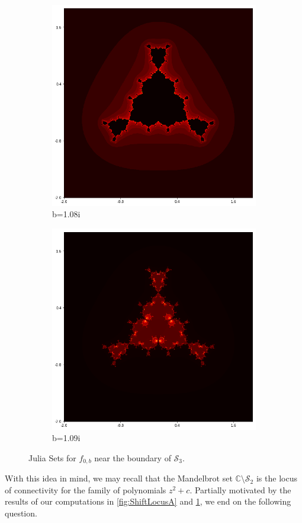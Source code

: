 \documentclass{amsart}
\newcommand{\bbC}{\mathbb{C}}
\newcommand{\Shift}[1]{ \mathcal{S}_{#1}}
\theoremstyle{definition}
\theoremstyle{remark}
\numberwithin{equation}{section}
\begin{document}
\begin{figure}[h]
\begin{subfigure}{.34\textwidth}
   \includegraphics[width=.8\linewidth]{Julia36.png}
   \caption{b=1.08i}
 \end{subfigure}
 \begin{subfigure}{.34\textwidth}
   \centering
   \includegraphics[width=.8\linewidth]{Julia35.png}
   \caption{b=1.09i}
 \end{subfigure}
 \caption{Julia Sets for $f_{0,b}$ near the boundary of $\Shift{3}$.}
 \label{fig:Julia3}
 \end{figure}

 With this idea in mind, we may recall that the Mandelbrot set $\bbC\setminus\Shift{2}$ is the locus of connectivity for the family of polynomials $z^2+c$. Partially motivated by the results of our computations in \cref{fig:ShiftLocusA} and \cref{fig:Julia3}, we end on the following question.
\end{document}
